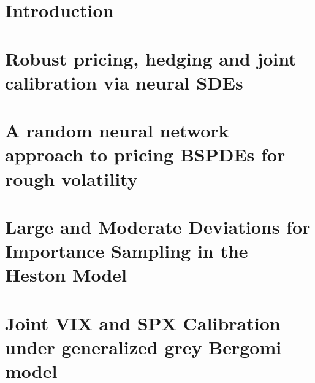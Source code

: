 \chapter{Introduction}



\myclearpage{}
\chapter{Robust pricing, hedging and joint calibration via neural SDEs}
\label{chap:reschap1}
 

\myclearpage{}
\chapter[Random neural networks for rough volatility BSPDEs]{A random neural network approach to pricing BSPDEs for rough volatility}
\label{chap:reschap2}
 

\myclearpage{}
\chapter[Large and Moderate Deviations for Importance Sampling]{Large and Moderate Deviations for Importance Sampling in the Heston Model}
\label{chap:reschap3}
 

 \myclearpage{}
\chapter[Joint VIX and SPX Calibration under ggBergomi]{Joint VIX and SPX Calibration under generalized grey Bergomi model}
\label{chap:reschap4}
 

% 

% 

